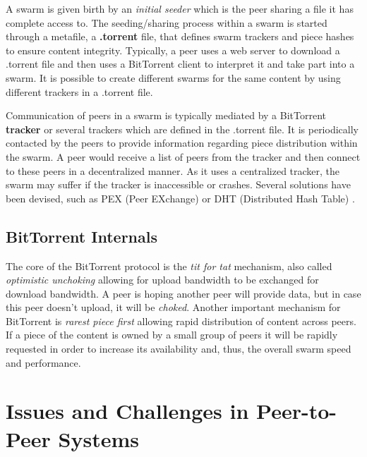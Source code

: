 A swarm is given birth by an \textit{initial seeder} which is the peer sharing
a file it has complete access to. The seeding/sharing process within a swarm
is started through a metafile, a \textbf{.torrent} file, that defines swarm
trackers and piece hashes to ensure content integrity. Typically, a peer uses
a web server to download a .torrent file and then uses a BitTorrent client to
interpret it and take part into a swarm. It is possible to create different
swarms for the same content by using different trackers in a .torrent file.

Communication of peers in a swarm is typically mediated by a BitTorrent
\textbf{tracker} or several trackers which are defined in the .torrent file.
It is periodically contacted by the peers to provide information regarding
piece distribution within the swarm. A peer would receive a list of peers from
the tracker and then connect to these peers in a decentralized manner. As it
uses a centralized tracker, the swarm may suffer if the tracker is
inaccessible or crashes. Several solutions have been devised, such as PEX
(Peer EXchange) \cite{pex} or DHT (Distributed Hash Table) \cite{dht-paper}.


\subsection{BitTorrent Internals}

The core of the BitTorrent protocol is the \textit{tit for tat} mechanism,
also called \textit{optimistic unchoking} allowing for upload bandwidth to be
exchanged for download bandwidth. A peer is hoping another peer will provide
data, but in case this peer doesn't upload, it will be \textit{choked}.
Another important mechanism for BitTorrent is \textit{rarest piece first}
allowing rapid distribution of content across peers. If a piece of the content
is owned by a small group of peers it will be rapidly requested in order to
increase its availability and, thus, the overall swarm speed and performance.


\section{Issues and Challenges in Peer-to-Peer Systems}
\label{sec:p2p-systems:issues}


